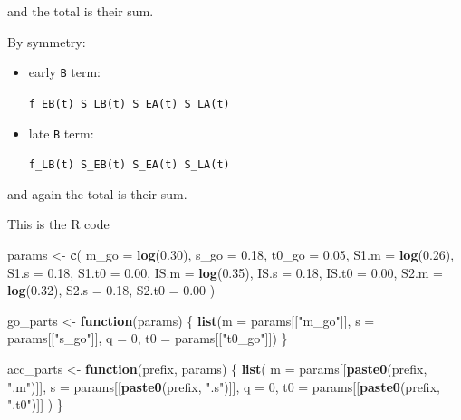 \documentclass[
]{article}
\newenvironment{Shaded}{\begin{snugshade}}{\end{snugshade}}
\newcommand{\AttributeTok}[1]{\textcolor[rgb]{0.13,0.29,0.53}{#1}}
\newcommand{\ControlFlowTok}[1]{\textcolor[rgb]{0.13,0.29,0.53}{\textbf{#1}}}
\newcommand{\DecValTok}[1]{\textcolor[rgb]{0.00,0.00,0.81}{#1}}
\newcommand{\FloatTok}[1]{\textcolor[rgb]{0.00,0.00,0.81}{#1}}
\newcommand{\FunctionTok}[1]{\textcolor[rgb]{0.13,0.29,0.53}{\textbf{#1}}}
\newcommand{\NormalTok}[1]{#1}
\newcommand{\OtherTok}[1]{\textcolor[rgb]{0.56,0.35,0.01}{#1}}
\newcommand{\StringTok}[1]{\textcolor[rgb]{0.31,0.60,0.02}{#1}}
\begin{document}
and the total is their sum.

By symmetry:

\begin{itemize}
\item
  early \texttt{B} term:

  \texttt{f\_EB(t)\ S\_LB(t)\ S\_EA(t)\ S\_LA(t)}
\item
  late \texttt{B} term:

  \texttt{f\_LB(t)\ S\_EB(t)\ S\_EA(t)\ S\_LA(t)}
\end{itemize}

and again the total is their sum.

This is the R code

\begin{Shaded}
\begin{Highlighting}[]
\NormalTok{params }\OtherTok{\textless{}{-}} \FunctionTok{c}\NormalTok{(}
  \AttributeTok{m\_go =} \FunctionTok{log}\NormalTok{(}\FloatTok{0.30}\NormalTok{), }\AttributeTok{s\_go =} \FloatTok{0.18}\NormalTok{, }\AttributeTok{t0\_go =} \FloatTok{0.05}\NormalTok{,}
  \AttributeTok{S1.m =} \FunctionTok{log}\NormalTok{(}\FloatTok{0.26}\NormalTok{), }\AttributeTok{S1.s =} \FloatTok{0.18}\NormalTok{, }\AttributeTok{S1.t0 =} \FloatTok{0.00}\NormalTok{,}
  \AttributeTok{IS.m =} \FunctionTok{log}\NormalTok{(}\FloatTok{0.35}\NormalTok{), }\AttributeTok{IS.s =} \FloatTok{0.18}\NormalTok{, }\AttributeTok{IS.t0 =} \FloatTok{0.00}\NormalTok{,}
  \AttributeTok{S2.m =} \FunctionTok{log}\NormalTok{(}\FloatTok{0.32}\NormalTok{), }\AttributeTok{S2.s =} \FloatTok{0.18}\NormalTok{, }\AttributeTok{S2.t0 =} \FloatTok{0.00}
\NormalTok{)}

\NormalTok{go\_parts }\OtherTok{\textless{}{-}} \ControlFlowTok{function}\NormalTok{(params) \{}
  \FunctionTok{list}\NormalTok{(}\AttributeTok{m =}\NormalTok{ params[[}\StringTok{"m\_go"}\NormalTok{]], }\AttributeTok{s =}\NormalTok{ params[[}\StringTok{"s\_go"}\NormalTok{]], }\AttributeTok{q =} \DecValTok{0}\NormalTok{, }\AttributeTok{t0 =}\NormalTok{ params[[}\StringTok{"t0\_go"}\NormalTok{]])}
\NormalTok{\}}

\NormalTok{acc\_parts }\OtherTok{\textless{}{-}} \ControlFlowTok{function}\NormalTok{(prefix, params) \{}
  \FunctionTok{list}\NormalTok{(}
    \AttributeTok{m =}\NormalTok{ params[[}\FunctionTok{paste0}\NormalTok{(prefix, }\StringTok{".m"}\NormalTok{)]],}
    \AttributeTok{s =}\NormalTok{ params[[}\FunctionTok{paste0}\NormalTok{(prefix, }\StringTok{".s"}\NormalTok{)]],}
    \AttributeTok{q =} \DecValTok{0}\NormalTok{,}
    \AttributeTok{t0 =}\NormalTok{ params[[}\FunctionTok{paste0}\NormalTok{(prefix, }\StringTok{".t0"}\NormalTok{)]]}
\NormalTok{  )}
\NormalTok{\}}


\end{Highlighting}
\end{Shaded}
\end{document}

